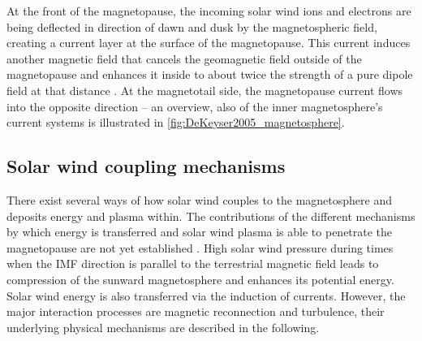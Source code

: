 At the front of the magnetopause, the incoming solar wind ions and electrons are being deflected in direction of dawn and dusk by the magnetospheric field, creating a current layer at the surface of the magnetopause. This current induces another magnetic field that cancels the geomagnetic field outside of the magnetopause and enhances it inside to about twice the strength of a pure dipole field at that distance \citep{DeKeyser2005}. At the magnetotail side, the magnetopause current flows into the opposite direction -- an overview, also of the inner magnetosphere's current systems is illustrated in \autoref{fig:DeKeyser2005_magnetosphere}.
\begin{figure}[htb]
\end{figure}


\subsection{Solar wind coupling mechanisms}
\label{sec:solar_wind_coupling}
There exist several ways of how solar wind couples to the magnetosphere and deposits energy and plasma within. The contributions of the different mechanisms by which energy is transferred and solar wind plasma is able to penetrate the magnetopause are not yet established \citep{Phan2005}. High solar wind pressure during times when the IMF direction is parallel to the terrestrial magnetic field leads to compression of the sunward magnetosphere and enhances its potential energy. Solar wind energy is also transferred via the induction of currents. However, the major interaction processes are magnetic reconnection and turbulence, their underlying physical mechanisms are described in the following.

